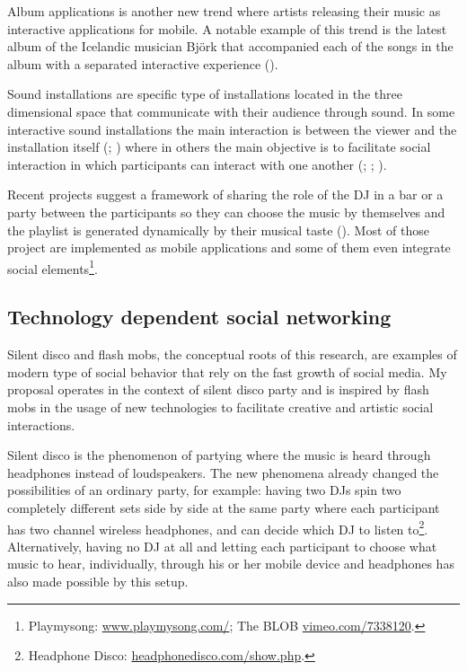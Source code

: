 \documentclass[a4paper,11pt]{article}
\begin{document}
Album applications is another new trend where artists releasing their music as interactive applications for mobile.
A notable example of this trend is the latest album of the Icelandic musician Bj\"{o}rk that accompanied each of the songs in the album with a separated interactive experience (\cite{stimulant13}).

Sound installations are specific type of installations located in the three dimensional space that communicate with their audience through sound.
In some interactive sound installations the main interaction is between the viewer and the installation itself (\cite{web:visnjic}; \cite{web:cardiff01}) where in others the main objective is to facilitate social interaction in which participants can interact with one another (\cite{eng03}; \cite{web:kirn12}; \cite{web:murray-browne13}).

Recent projects suggest a framework of sharing the role of the DJ in a bar or a party between the participants so they can choose the music by themselves and the playlist is generated dynamically by their musical taste (\cite{web:shaw}).
Most of those project are implemented as mobile applications and some of them even integrate social elements\footnote{Playmysong: \href{http://www.playmysong.com/}{www.playmysong.com/}; The BLOB \href{http://vimeo.com/7338120}{vimeo.com/7338120}.}.

\subsection{Technology dependent social networking}

Silent disco and flash mobs, the conceptual roots of this research, are examples of modern type of social behavior that rely on the fast growth of social media.
My proposal operates in the context of silent disco party and is inspired by flash mobs in the usage of new technologies to facilitate creative and artistic social interactions.

Silent disco is the phenomenon of partying where the music is heard through headphones instead of loudspeakers.
The new phenomena already changed the possibilities of an ordinary party, for example: having two DJs spin two completely different sets side by side at the same party where each participant has two channel wireless headphones, and can decide which DJ to listen to\footnote{Headphone Disco: \href{http://headphonedisco.com/show.php}{headphonedisco.com/show.php}.}.
Alternatively, having no DJ at all and letting each participant to choose what music to hear, individually, through his or her mobile device and headphones has also made possible by this setup.
\end{document}
